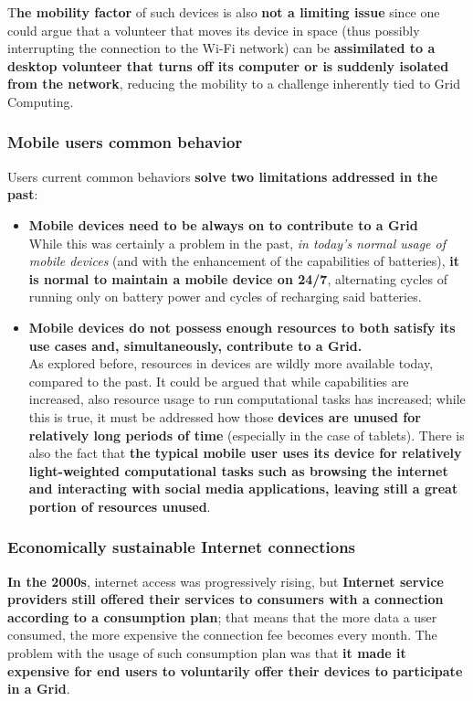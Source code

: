 T\textbf{he mobility factor} of such devices is also \textbf{not a limiting issue} since one could argue that a volunteer that moves its device in space (thus possibly interrupting the connection to the Wi-Fi network) can be \textbf{assimilated to a desktop volunteer that turns off its computer or is suddenly isolated from the network}, reducing the mobility to a challenge inherently tied to Grid Computing.

\subsubsection{Mobile users common behavior}\label{mobile_users_common_behavior}
Users current common behaviors \textbf{solve two limitations addressed in the past}:
\begin{itemize}
    \item \textbf{Mobile devices need to be always on to contribute to a Grid}\\
    While this was certainly a problem in the past, \textit{in today's normal usage of mobile devices} (and with the enhancement of the capabilities of batteries), \textbf{it is normal to maintain a mobile device on 24/7}, alternating cycles of running only on battery power and cycles of recharging said batteries.
    \item \textbf{Mobile devices do not possess enough resources to both satisfy its use cases and, simultaneously, contribute to a Grid.}\\
    As explored before, resources in devices are wildly more available today, compared to the past. It could be argued that while capabilities are increased, also resource usage to run computational tasks has increased; while this is true, it must be addressed how those \textbf{devices are unused for relatively long periods of time} (especially in the case of tablets). There is also the fact that \textbf{the typical mobile user uses its device for relatively light-weighted computational tasks such as browsing the internet and interacting with social media applications, leaving still a great portion of resources unused}.
\end{itemize}

\subsubsection{Economically sustainable Internet connections}\label{economically_sustainable_internet_connections}
\textbf{In the 2000s}, internet access was progressively rising, but \textbf{Internet service providers still offered their services to consumers with a connection according to a consumption plan}; that means that the more data a user consumed, the more expensive the connection fee becomes every month. The problem with the usage of such consumption plan was that \textbf{it made it expensive for end users to voluntarily offer their devices to participate in a Grid}.

